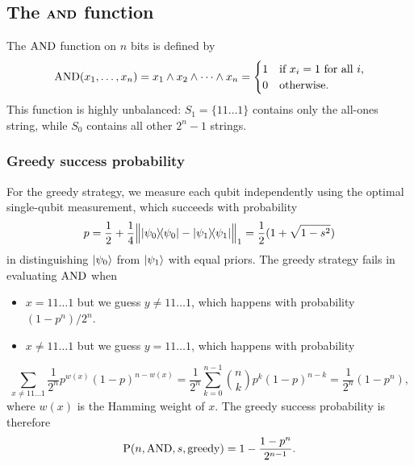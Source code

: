
\subsection{The \texorpdfstring{$\boldsymbol{\AND}$}{AND} function}

The $\AND$ function on $n$ bits is defined by
\begin{equation}
    \AND(x_1,\ldots,x_n) = x_1 \wedge x_2 \wedge \cdots \wedge x_n = \begin{cases}
        1 & \text{if } x_i = 1 \text{ for all } i, \\
        0 & \text{otherwise}.
    \end{cases}
\end{equation}
This function is highly unbalanced: $S_1 = \{11\ldots1\}$ contains only the all-ones string, while $S_0$ contains all other $2^n - 1$ strings.

\subsubsection{Greedy success probability}

For the greedy strategy, we measure each qubit independently using the optimal single-qubit measurement, which succeeds with probability 
$$p = \frac{1}{2} + \frac{1}{4} \norm[\Big]{ \ketbra{\psi_0} - \ketbra{\psi_1} }_1 = \frac{1}{2}(1+\sqrt{1-s^2})$$ 
in distinguishing $\ket{\psi_0}$ from $\ket{\psi_1}$ with equal priors.
The greedy strategy fails in evaluating $\AND$ when
\begin{itemize}
    \item $x = 11\ldots1$ but we guess $y \neq 11\ldots1$, which happens with probability $(1-p^n)/2^n$.
    \item $x \neq 11\ldots1$ but we guess $y = 11\ldots1$, which happens with probability
\end{itemize}
\begin{equation}
    \sum_{x \neq 11\ldots1} \frac{1}{2^n} p^{w(x)} (1-p)^{n-w(x)}
    = \frac{1}{2^n} \sum_{k=0}^{n-1} \binom{n}{k} p^k (1-p)^{n-k}
    = \frac{1}{2^n} (1 - p^n),
\end{equation}
where $w(x)$ is the Hamming weight of $x$.
The greedy success probability is therefore
\begin{equation}
    \P(n,\AND,s,\greedy) = 1-\frac{1-p^n}{2^{n-1}}.
\end{equation}

